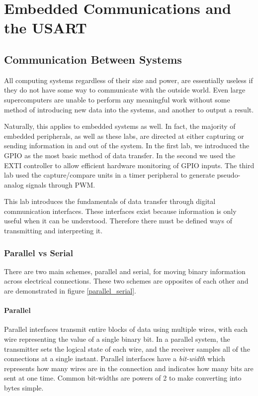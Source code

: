 \documentclass[openany,11pt,fleqn]{book} %
\begin{document}
	
\chapter{Embedded Communications and the USART}

\section{Communication Between Systems}
All computing systems regardless of their size and power, are essentially useless if they do not have some way to communicate with the outside world. Even large supercomputers are unable to perform any meaningful work without some method of introducing new data into the systems, and another to output a result. 

Naturally, this applies to embedded systems as well. In fact, the majority of embedded peripherals, as well as these labs, are directed at either capturing or sending information in and out of the system. In the first lab, we introduced the GPIO as the most basic method of data transfer. In the second we used the EXTI controller to allow efficient hardware monitoring of GPIO inputs. The third lab used the capture/compare units in a timer peripheral to generate pseudo-analog signals through PWM. 

This lab introduces the fundamentals of data transfer through digital communication interfaces. These interfaces exist because information is only useful when it can be understood. Therefore there must be defined ways of transmitting and interpreting it.

\subsection{Parallel vs Serial}

There are two main schemes, parallel and serial, for moving binary information across electrical connections. These two schemes are opposites of each other and are demonstrated in figure \ref{parallel_serial}. 

\subsubsection{Parallel}
Parallel interfaces transmit entire blocks of data using multiple wires, with each wire representing the value of a single binary bit. In a parallel system, the transmitter sets the logical state of each wire, and the receiver samples all of the connections at a single instant. Parallel interfaces have a \textit{bit-width} which represents how many wires are in the connection and indicates how many bits are sent at one time. Common bit-widths are powers of 2 to make converting into bytes simple. 
\end{document}
